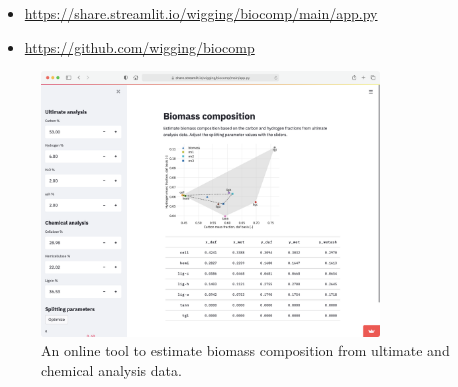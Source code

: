 \begin{itemize}
    \item \url{https://share.streamlit.io/wigging/biocomp/main/app.py}
    \item \url{https://github.com/wigging/biocomp}
\end{itemize}

\begin{figure}[H]
    \centering
    \includegraphics[width=0.8\textwidth]{figures/webtool.png}
    \caption{An online tool to estimate biomass composition from ultimate and chemical analysis data.}
    \label{fig:webtool}
\end{figure}
